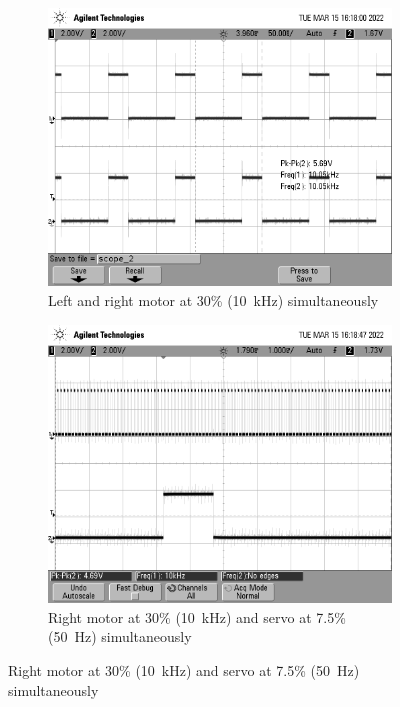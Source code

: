 \documentclass[CMPE]{../KGCOEReport}
\begin{document}
	\begin{figure}[ht]
		\centering
		 \begin{subfigure}[b]{0.4\textwidth}
		     \centering
		     \includegraphics[width=\textwidth]{scope_2}
		     \caption{Left and right motor at 30\% (\SI{10}{\kilo\hertz}) simultaneously}
		     \label{fig:cap3}
		 \end{subfigure}
		 \hfill
		 \begin{subfigure}[b]{0.4\textwidth}
		     \centering
		     \includegraphics[width=\textwidth]{scope_3}
		     \caption{Right motor at 30\% (\SI{10}{\kilo\hertz}) and servo at 7.5\% (\SI{50}{\hertz}) simultaneously}
		     \label{fig:cap4}
		 \end{subfigure}
	\end{figure}
\end{document}
